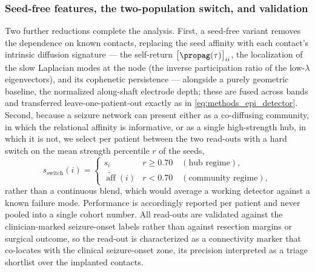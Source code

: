 \subsubsection{Seed-free features, the two-population switch, and validation}
\label{sssec:methods_epi_seedfree}
Two further reductions complete the analysis. First, a seed-free variant removes the dependence on known contacts, replacing the seed affinity with each contact's intrinsic diffusion signature --- the self-return \(\big[\propag(\tau)\big]_{ii}\), the localization of the slow Laplacian modes at the node (the inverse participation ratio of the low-\(\lambda\) eigenvectors), and its cophenetic persistence --- alongside a purely geometric baseline, the normalized along-shaft electrode depth; these are fused across bands and transferred leave-one-patient-out exactly as in \eqref{eq:methods_epi_detector}. Second, because a seizure network can present either as a co-diffusing community, in which the relational affinity is informative, or as a single high-strength hub, in which it is not, we select per patient between the two read-outs with a hard switch on the mean strength percentile \(r\) of the seeds,
\begin{equation}
    s_{\mathrm{switch}}(i) = \begin{cases} s_{i} & r \ge 0.70 \quad(\text{hub regime}),\\[2pt] \widetilde{\operatorname{aff}}(i) & r < 0.70 \quad(\text{community regime}), \end{cases}
    \label{eq:methods_epi_switch}
\end{equation}
rather than a continuous blend, which would average a working detector against a known failure mode. Performance is accordingly reported per patient and never pooled into a single cohort number. All read-outs are validated against the clinician-marked seizure-onset labels rather than against resection margins or surgical outcome, so the read-out is characterized as a connectivity marker that co-locates with the clinical seizure-onset zone, its precision interpreted as a triage shortlist over the implanted contacts.
